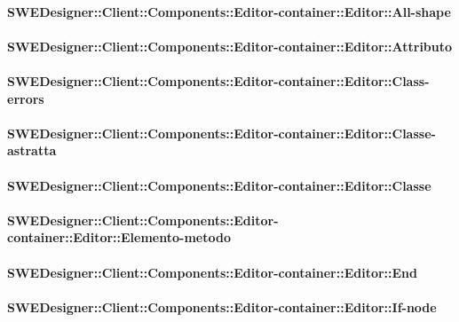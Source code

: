 			\paragraph{SWEDesigner::Client::Components::Editor-container::Editor::All-shape}
				
				
			\paragraph{SWEDesigner::Client::Components::Editor-container::Editor::Attributo}
				
				
			\paragraph{SWEDesigner::Client::Components::Editor-container::Editor::Class-errors}
				
				
			\paragraph{SWEDesigner::Client::Components::Editor-container::Editor::Classe-astratta}
				
				
			\paragraph{SWEDesigner::Client::Components::Editor-container::Editor::Classe}
				
				
			\paragraph{SWEDesigner::Client::Components::Editor-container::Editor::Elemento-metodo}
				
				
			\paragraph{SWEDesigner::Client::Components::Editor-container::Editor::End}
				
				
			\paragraph{SWEDesigner::Client::Components::Editor-container::Editor::If-node}
				
				
